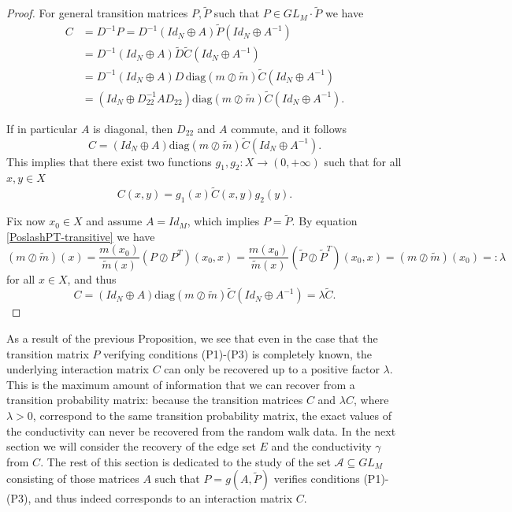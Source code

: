 \documentclass[a4paper,11pt,oneside]{amsart}
\begin{document}
\begin{proof} For general transition matrices $P, \tilde P$ such that $P\in GL_M\cdot \tilde P$ we have
\begin{align*}
    C & = D^{-1}P = D^{-1}(Id_N\oplus A) \tilde P (Id_N\oplus A^{-1})
    \\ & = D^{-1}(Id_N\oplus A)\tilde D\tilde C (Id_N\oplus A^{-1})
    \\ & = D^{-1}(Id_N\oplus A)D\,\mbox{diag}(m\oslash \tilde m)\tilde C (Id_N\oplus A^{-1})
    \\ & = (Id_N\oplus D_{22}^{-1}AD_{22}) \mbox{diag}(m\oslash \tilde m) \tilde C (Id_N\oplus A^{-1}).
\end{align*}

If in particular $A$ is diagonal, then $D_{22}$ and $A$ commute, and it follows
$$C =(Id_N\oplus A) \mbox{diag}(m\oslash \tilde m)\tilde C (Id_N\oplus A^{-1}).$$
This implies that there exist two functions $g_1, g_2:X\rightarrow (0,+\infty)$ such that for all $x,y\in X$ 
$$ C(x,y) = g_1(x)\tilde C(x,y)g_2(y). $$ 

Fix now $x_0\in X$ and assume $A=Id_M$, which implies $P= \tilde P$. By equation \eqref{PoslashPT-transitive} we have $$(m\oslash \tilde m)(x) =  \frac{m(x_0)}{\tilde m(x)}(P\oslash P^T)(x_0,x)  = \frac{m(x_0)}{\tilde m(x)}(\tilde P\oslash \tilde P^T)(x_0,x) = (m\oslash \tilde m)(x_0)=:\lambda$$
for all $x\in X$, and thus 
$$ C = (Id_N\oplus A)\mbox{diag}(m\oslash \tilde m) \tilde C (Id_N\oplus A^{-1}) = \lambda \tilde C. $$ 
\end{proof}

As a result of the previous Proposition, we see that even in the case that the transition matrix $P$ verifying conditions (P1)-(P3) is completely known, the underlying interaction matrix $C$ can only be recovered up to a positive factor $\lambda$. This is the maximum amount of information that we can recover from a transition probability matrix: because the transition matrices $C$ and $\lambda C$, where $\lambda >0$, correspond to the same transition probability matrix, the exact values of the conductivity can never be recovered from the random walk data. In the next section we will consider the recovery of the edge set $E$ and the conductivity $\gamma$ from $C$. The rest of this section is dedicated to the study of the set $\mathcal A \subseteq GL_M$ consisting of those matrices $A$ such that $P=g(A,\tilde P)$ verifies conditions (P1)-(P3), and thus indeed corresponds to an interaction matrix $C$.\\
\end{document}
